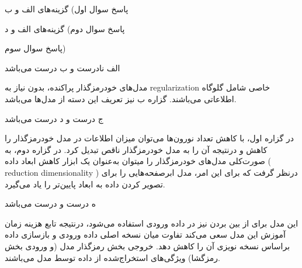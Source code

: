 \vspace{1cm}

پاسخ سوال اول) گزینه‌های الف و ب

\vspace{1cm}

پاسخ سوال دوم) گزینه‌های الف و د




\vspace{1cm}
پاسخ سوال سوم)



الف نادرست و ب درست می‌باشد


مدل‌های خودرمز‌گذار پراکنده، بدون نیاز به regularization خاصی شامل گلوگاه اطلاعاتی می‌باشند. گزاره ب نیز تعریف این دسته از مدل‌ها می‌باشد.

\vspace{1cm}


ج درست و د درست می‌باشد




در گزاره اول، با کاهش تعداد نورون‌ها می‌توان میزان اطلاعات در مدل خودرمز‌گذار را کاهش و درنتیجه آن را به مدل خودرمزگذار ناقص تبدیل کرد. در گزاره دوم، به صورت‌کلی مدل‌های خودرمزگذار را میتوان به‌عنوان یک ابزار کاهش ابعاد داده ( reduction dimensionality ) درنظر گرفت که برای این امر، مدل ابرصفحه‌هایی را برای تصویر کردن داده به ابعاد پایین‌تر را یاد می‌گیرد.

\vspace{1cm}

ه درست  و درست می‌باشد




این مدل برای از بین بردن نیز در داده ورودی استفاده می‌شود، درنتیجه تابع هزینه زمان آموزش این مدل سعی می‌کند تفاوت میان نسخه اصلی داده ورودی و بازسازی داده براساس نسخه نویزی آن را کاهش دهد. خروجی بخش رمز‌گذار مدل (و ورودی بخش رمز‌گشا) ویژگی‌های استخراج‌شده از داده توسط مدل می‌باشند.